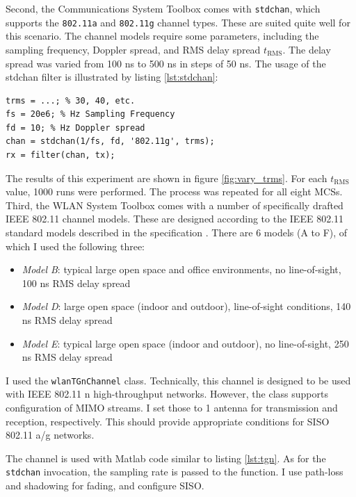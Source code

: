 Second, the Communications System Toolbox comes with \texttt{stdchan}, which supports the \texttt{802.11a} and \texttt{802.11g} channel types. These are suited quite well for this scenario. The channel models require some parameters, including the sampling frequency, Doppler spread, and \gls{RMS} delay spread $ t_{\text{RMS}} $. The delay spread was varied from 100 ns to 500 ns in steps of 50 ns. The usage of the stdchan filter is illustrated by listing \ref{lst:stdchan}:

\begin{lstlisting}[captionpos=b,caption={Matlab stdchan Channel Model},label=lst:stdchan]
trms = ...; % 30, 40, etc.
fs = 20e6; % Hz Sampling Frequency
fd = 10; % Hz Doppler spread
chan = stdchan(1/fs, fd, '802.11g', trms);
rx = filter(chan, tx);
\end{lstlisting}

The results of this experiment are shown in figure \ref{fig:vary_trms}. For each $ t_{\text{RMS}} $ value, 1000 runs were performed. The process was repeated for all eight \glspl{MCS}.\\

Third, the WLAN System Toolbox comes with a number of specifically drafted IEEE 802.11 channel models. These are designed according to the IEEE 802.11 standard models described in the specification \cite{ieee2012}. There are 6 models (A to F), of which I used the following three:

\begin{itemize}
	\item \textit{Model B}: typical large open space and office environments, no line-of-sight, 100 ns \gls{RMS} delay spread
	\item \textit{Model D}: large open space (indoor and outdoor), line-of-sight conditions, 140 ns \gls{RMS} delay spread
	\item \textit{Model E}: typical large open space (indoor and outdoor), no line-of-sight, 250 ns \gls{RMS} delay spread
\end{itemize}

I used the \texttt{wlanTGnChannel} class. Technically, this channel is designed to be used with IEEE 802.11 n high-throughput networks. However, the class supports configuration of \gls{MIMO} streams. I set those to 1 antenna for transmission and reception, respectively. This should provide appropriate conditions for \gls{SISO} 802.11 a/g networks.

The channel is used with Matlab code similar to listing \ref{lst:tgn}. As for the \texttt{stdchan} invocation, the sampling rate is passed to the function. I use path-loss and shadowing for fading, and configure \gls{SISO}.

